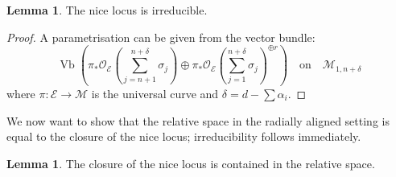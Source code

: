 \documentclass[11pt]{amsart}
\newcommand{\OO}{\mathcal{O}}
\renewcommand{\to}{\rightarrow}
\theoremstyle{definition}
\newtheorem{lem}[thm]{Lemma}
\theoremstyle{definition}
\begin{document}
\begin{lem}
The nice locus is irreducible.
\end{lem}
\begin{proof}
A parametrisation can be given from the vector bundle:
\[ \operatorname{Vb}\left(\pi_*\OO_{\mathcal E}(\sum_{j=n+1}^{n+\delta}\sigma_j)\oplus\pi_*\OO_{\mathcal E}(\sum_{j=1}^{n+\delta}\sigma_j)^{\oplus r}\right) \quad \text{on} \quad \mathcal{M}_{1,n+\delta}\]
where $\pi\colon\mathcal E\to\mathcal M$ is the universal curve and $\delta=d-\sum\alpha_i$.
\end{proof}

We now want to show that the relative space in the radially aligned setting is equal to the closure of the nice locus; irreducibility follows immediately.

\begin{lem}
The closure of the nice locus is contained in the relative space.
\end{lem}
\end{document}
